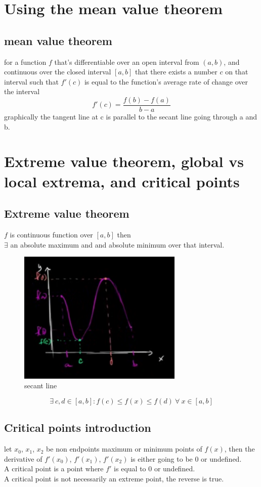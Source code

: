 \documentclass{article}
\begin{document}
\section{Using the mean value theorem}
    \subsection{mean value theorem}
        for a function \(f\) that's differentiable over an open interval from \((a,b)\), and continuous over the closed interval \([a,b]\)  that there exists a number \(c\) on that interval such that \(f'(c)\) is equal to the function's average rate of change over the interval 
            \[f'(c) = \frac{f(b) - f(a)}{b - a}\]
        graphically the tangent line at c is parallel to the secant line going through a and b.
\section{Extreme value theorem, global vs local extrema, and critical points}
    \subsection{Extreme value theorem}
        \(f\) is continuous function over \([a,b]\) then \\
        \( \exists \) an absolute maximum and and absolute minimum over that interval.  
        \begin{figure}[ht]  
            \centering
            \includegraphics[bb=0 0 323 262, width=0.7\textwidth]{images/minimum_maximum.png}
            \caption{secant line}\label{fig:minimum_maximum}
        \end{figure}
         \[\exists\  c, d \in [a, b] : f(c) \le f(x) \le f(d)\ \forall\ x \in [a,b] \]
     \subsection{Critical points introduction}
        let \(x_0\), \(x_1\), \(x_2\) be non endpoints  maximum or minimum points of \(f(x)\), then the derivative of \(f'(x_0)\), \(f'(x_1)\), \(f'(x_2)\) is either going to be 0 or undefined.\\ 
        A critical point is a point where \(f'\) is equal to 0 or undefined.\\ 
        A critical point is not necessarily an extreme point, the reverse is true.
\end{document}
